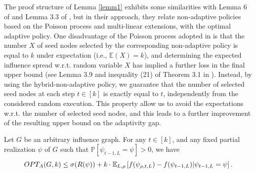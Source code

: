 The proof structure of Lemma \ref{lemm1} exhibits some similarities with Lemma 6 of \cite{Asadpour16} and Lemma 3.3 of \cite{Chen2019}, but in their approach, they relate non-adaptive policies based on the Poisson process and multi-linear extensions, with the optimal adaptive policy. One disadvantage of the Poisson process adopted in \cite{Chen2019} is that the number $X$ of seed nodes selected by the corresponding non-adaptive policy is equal to $k$ under expectation (i.e., $\mathbb{E}(X)=k$), and determining the expected influence spread w.r.t. random variable $X$ has implied a further loss in the final upper bound (see Lemma 3.9 and inequality (21) of Theorem 3.1 in \cite{Chen2019}). Instead, by using the hybrid-non-adaptive policy, we guarantee that the number of selected seed nodes at each step $t\in [k]$ is exactly equal to $t$,  independently from the considered random execution. This property allow us to avoid the expectations w.r.t. the number of selected seed nodes, and this leads to a further improvement of the resulting upper bound on the adaptivity gap.
\begin{lemma}\label{lemm1}
Let $G$ be an arbitrary influence graph. For any $t\in [k]$, and any fixed partial realization $\psi$ of $G$ such that $\mathbb{P}[\psi_{t-1,L}=\psi]>0$, we have $$OPT_A(G,k)\leq 
\sigma(R(\psi))+k\cdot \mathbb{E}_{L,\rho}\left[f({\psi}_{\rho,t,L})-f(\psi_{t-1,L})|\psi_{t-1,L}=\psi\right].$$
\end{lemma}
